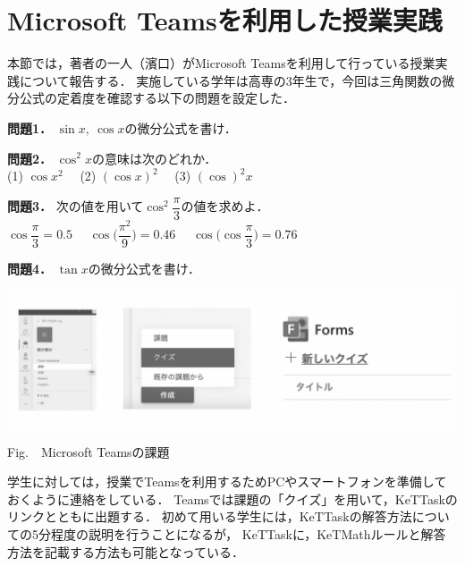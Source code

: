 \documentclass[a4j,12pt]{ujarticle}
\begin{document}
\newpage%

\section{Microsoft Teamsを利用した授業実践}

本節では，著者の一人（濱口）がMicrosoft Teamsを利用して行っている授業実践について報告する．
実施している学年は高専の3年生で，今回は三角関数の微分公式の定着度を確認する以下の問題を設定した．\vspace*{2mm}

{\bf 問題1．}
$\sin x, \ \cos x$の微分公式を書け．\vspace*{3mm}

{\bf 問題2．}
$\cos^2\! x$の意味は次のどれか．　\vspace*{1mm}\\
\hspace*{3zw}%
(1) $\cos x^2$　
(2) $(\cos x)^2$　
(3) $(\cos)^2x$\vspace*{3mm}

{\bf 問題3．}
次の値を用いて$\cos^2\!\dfrac{\pi}{3}$の値を求めよ．\\
\hspace*{3zw}%
$\cos \dfrac{\pi}{3}\!=\!0.5$　
$\cos \bigl(\dfrac{\pi^2}{9}\bigr)\!=\!0.46$　
$\cos \bigl(\cos\dfrac{\pi}{3}\bigr)\!=\!0.76$\vspace*{3mm}

{\bf 問題4．}
$\tan x$の微分公式を書け．

\vspace{-10mm}

\begin{center}
\includegraphics[bb=0.00 0.00 820.32 249.12,width=140mm]{fig/teams1bw.pdf}

\addtocounter{figure}{1}Fig.\thefigure\ \ Microsoft Teamsの課題
\end{center}

\vspace{-2mm}

学生に対しては，授業でTeamsを利用するためPCやスマートフォンを準備しておくように連絡をしている．
Teamsでは課題の「クイズ」を用いて，KeTTaskのリンクとともに出題する．
初めて用いる学生には，KeTTaskの解答方法についての5分程度の説明を行うことになるが，
KeTTaskに，KeTMathルールと解答方法を記載する方法も可能となっている．
\end{document}
